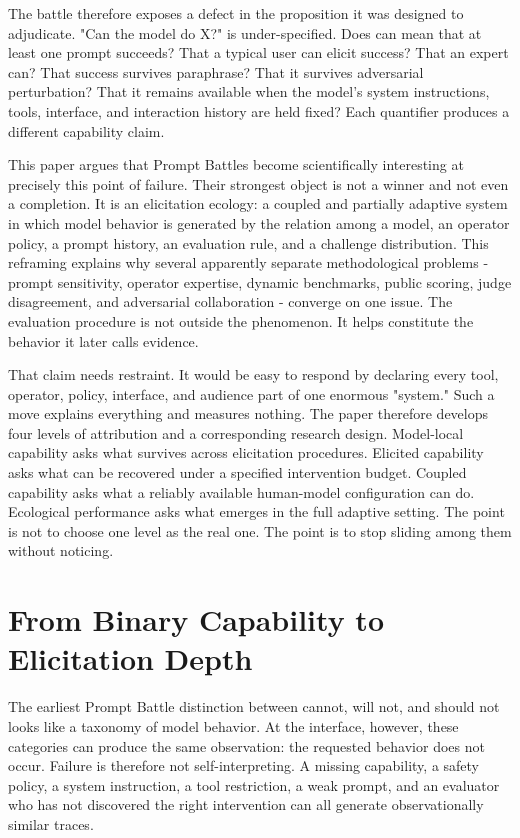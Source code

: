 \documentclass[11pt]{article}
\begin{document}
The battle therefore exposes a defect in the proposition it was designed to adjudicate. "Can the model do X?" is under-specified. Does can mean that at least one prompt succeeds? That a typical user can elicit success? That an expert can? That success survives paraphrase? That it survives adversarial perturbation? That it remains available when the model's system instructions, tools, interface, and interaction history are held fixed? Each quantifier produces a different capability claim.

This paper argues that Prompt Battles become scientifically interesting at precisely this point of failure. Their strongest object is not a winner and not even a completion. It is an elicitation ecology: a coupled and partially adaptive system in which model behavior is generated by the relation among a model, an operator policy, a prompt history, an evaluation rule, and a challenge distribution. This reframing explains why several apparently separate methodological problems - prompt sensitivity, operator expertise, dynamic benchmarks, public scoring, judge disagreement, and adversarial collaboration - converge on one issue. The evaluation procedure is not outside the phenomenon. It helps constitute the behavior it later calls evidence.

That claim needs restraint. It would be easy to respond by declaring every tool, operator, policy, interface, and audience part of one enormous "system." Such a move explains everything and measures nothing. The paper therefore develops four levels of attribution and a corresponding research design. Model-local capability asks what survives across elicitation procedures. Elicited capability asks what can be recovered under a specified intervention budget. Coupled capability asks what a reliably available human-model configuration can do. Ecological performance asks what emerges in the full adaptive setting. The point is not to choose one level as the real one. The point is to stop sliding among them without noticing.

\section{From Binary Capability to Elicitation Depth}
The earliest Prompt Battle distinction between cannot, will not, and should not looks like a taxonomy of model behavior. At the interface, however, these categories can produce the same observation: the requested behavior does not occur. Failure is therefore not self-interpreting. A missing capability, a safety policy, a system instruction, a tool restriction, a weak prompt, and an evaluator who has not discovered the right intervention can all generate observationally similar traces.
\end{document}
